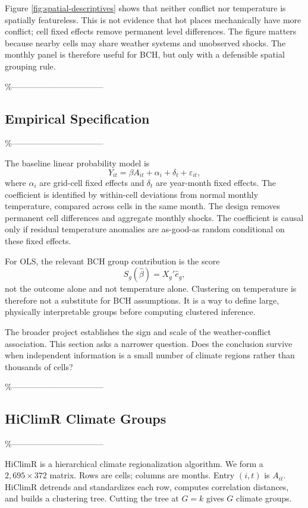 \documentclass[
]{article}
\begin{document}
Figure \ref{fig:spatial-descriptives} shows that neither conflict nor
temperature is spatially featureless. This is not evidence that hot
places mechanically have more conflict; cell fixed effects remove
permanent level differences. The figure matters because nearby cells may
share weather systems and unobserved shocks. The monthly panel is
therefore useful for BCH, but only with a defensible spatial grouping
rule.

\%---------------------------------

\subsection{Empirical Specification}

\%---------------------------------

The baseline linear probability model is \begin{equation}
Y_{it}=\beta A_{it}+\alpha_i+\delta_t+\varepsilon_{it},
\label{eq:empirical}
\end{equation} where \(\alpha_i\) are grid-cell fixed effects and
\(\delta_t\) are year-month fixed effects. The coefficient is identified
by within-cell deviations from normal monthly temperature, compared
across cells in the same month. The design removes permanent cell
differences and aggregate monthly shocks. The coefficient is causal only
if residual temperature anomalies are as-good-as random conditional on
these fixed effects.

For OLS, the relevant BCH group contribution is the score \[
S_g(\widehat\beta)=X_g'\widehat e_g,
\] not the outcome alone and not temperature alone. Clustering on
temperature is therefore not a substitute for BCH assumptions. It is a
way to define large, physically interpretable groups before computing
clustered inference.

The broader project establishes the sign and scale of the
weather-conflict association. This section asks a narrower question.
Does the conclusion survive when independent information is a small
number of climate regions rather than thousands of cells?

\%---------------------------------

\subsection{HiClimR Climate Groups}

\%---------------------------------

HiClimR is a hierarchical climate regionalization algorithm. We form a
\(2{,}695\times372\) matrix. Rows are cells; columns are months. Entry
\((i,t)\) is \(A_{it}\). HiClimR detrends and standardizes each row,
computes correlation distances, and builds a clustering tree. Cutting
the tree at \(G=k\) gives \(G\) climate groups.
\end{document}
